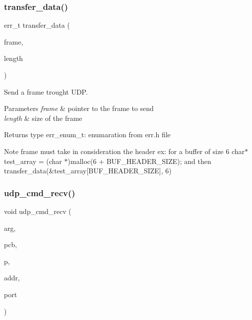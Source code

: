 \subsubsection{transfer\_data()}
{\footnotesize\ttfamily err\+\_\+t transfer\+\_\+data (\begin{DoxyParamCaption}\item[{char $\ast$}]{frame,  }\item[{uint16\+\_\+t}]{length }\end{DoxyParamCaption})}



Send a frame trought U\+DP. 


\begin{DoxyParams}{Parameters}
{\em frame} & pointer to the frame to send \\
\hline
{\em length} & size of the frame\\
\hline
\end{DoxyParams}
\begin{DoxyReturn}{Returns}
type err\+\_\+enum\+\_\+t\+: enumaration from err.\+h file
\end{DoxyReturn}
\begin{DoxyNote}{Note}
frame must take in consideration the header ex\+: for a buffer of size 6 char$\ast$ test\+\_\+array = (char $\ast$)malloc(6 + B\+U\+F\+\_\+\+H\+E\+A\+D\+E\+R\+\_\+\+S\+I\+ZE); and then transfer\+\_\+data(\&test\+\_\+array[\+B\+U\+F\+\_\+\+H\+E\+A\+D\+E\+R\+\_\+\+S\+I\+Z\+E], 6) 
\end{DoxyNote}
\mbox{\label{udp__peripheral_8c_a02046b4aed2b022cd328eacfcf3b048d}} 
\subsubsection{udp\_cmd\_recv()}
{\footnotesize\ttfamily void udp\+\_\+cmd\+\_\+recv (\begin{DoxyParamCaption}\item[{void $\ast$}]{arg,  }\item[{struct udp\+\_\+pcb $\ast$}]{pcb,  }\item[{struct pbuf $\ast$}]{p,  }\item[{const ip\+\_\+addr\+\_\+t $\ast$}]{addr,  }\item[{u16\+\_\+t}]{port }\end{DoxyParamCaption})}



